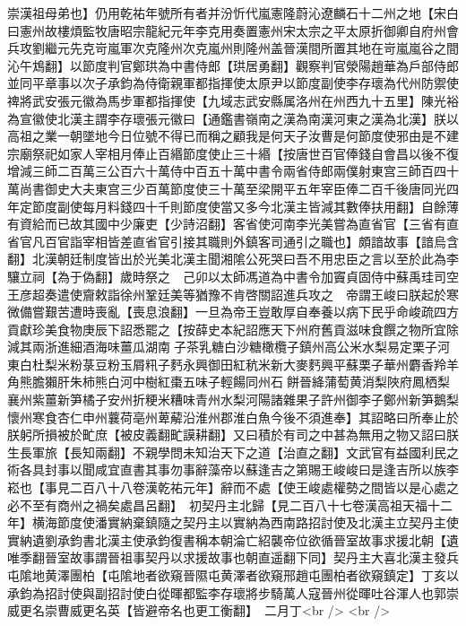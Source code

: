 崇漢祖母弟也】仍用乾祐年號所有者并汾忻代嵐憲隆蔚沁遼麟石十二州之地【宋白曰憲州故樓煩監牧唐昭宗龍紀元年李克用奏置憲州宋太宗之平太原折御卿自府州會兵攻劉繼元先克岢嵐軍次克隆州次克嵐州則隆州盖晉漢間所置其地在岢嵐嵐谷之間沁午鴆翻】以節度判官鄭珙為中書侍郎【珙居勇翻】觀察判官滎陽趙華為戶部侍郎並同平章事以次子承鈞為侍衛親軍都指揮使太原尹以節度副使李存瓌為代州防禦使禆將武安張元徽為馬步軍都指揮使【九域志武安縣属洛州在州西九十五里】陳光裕為宣徽使北漢主謂李存瓌張元徽曰【通鑑書嶺南之漢為南漢河東之漢為北漢】朕以高祖之業一朝墜地今日位號不得已而稱之顧我是何天子汝曹是何節度使邪由是不建宗廟祭祀如家人宰相月俸止百緡節度使止三十緡【按唐世百官俸錢自會昌以後不復增減三師二百萬三公百六十萬侍中百五十萬中書令兩省侍郎兩僕射東宫三師百四十萬尚書御史大夫東宫三少百萬節度使三十萬至梁開平五年宰臣俸二百千後唐同光四年定節度副使每月料錢四十千則節度使當又多今北漢主皆減其數俸扶用翻】自餘薄有資給而已故其國中少廉吏【少詩沼翻】客省使河南李光美嘗為直省官【三省有直省官凡百官詣宰相皆差直省官引接其職則外鎮客司通引之職也】頗諳故事【諳烏含翻】北漢朝廷制度皆出於光美北漢主聞湘隂公死哭曰吾不用忠臣之言以至於此為李驤立祠【為于偽翻】歲時祭之　己卯以太師馮道為中書令加竇貞固侍中蘇禹珪司空　王彦超奏遣使齎敕詣徐州鞏廷美等猶豫不肯啓關詔進兵攻之　帝謂王峻曰朕起於寒微備嘗艱苦遭時喪亂【喪息浪翻】一旦為帝王豈敢厚自奉養以病下民乎命峻疏四方貢獻珍美食物庚辰下詔悉罷之【按薛史本紀詔應天下州府舊貢滋味食饌之物所宜除減其兩浙進細酒海味薑瓜湖南子茶乳糖白沙糖橄欖子鎮州高公米水梨易定栗子河東白杜梨米粉菉豆粉玉屑籸子麫永興御田紅秔米新大麥麫興平蘇栗子華州麝香羚羊角熊膽獺肝朱柿熊白河中樹紅棗五味子輕餳同州石餅晉絳蒲萄黄消梨陜府鳳栖梨襄州紫薑新笋橘子安州折粳米糟味青州水梨河陽諸雜果子許州御李子鄭州新笋鵝梨懷州寒食杏仁申州蘘荷亳州萆薢沿淮州郡淮白魚今後不須進奉】其詔略曰所奉止於朕躬所損被於甿庶【被皮義翻甿謨耕翻】又曰積於有司之中甚為無用之物又詔曰朕生長軍旅【長知兩翻】不親學問未知治天下之道【治直之翻】文武官有益國利民之術各具封事以聞咸宜直書其事勿事辭藻帝以蘇逢吉之第賜王峻峻曰是逢吉所以族李崧也【事見二百八十八卷漢乾祐元年】辭而不處【使王峻處權勢之間皆以是心處之必不至有商州之禍矣處昌呂翻】　初契丹主北歸【見二百八十七卷漢高祖天福十二年】横海節度使潘實納棄鎮隨之契丹主以實納為西南路招討使及北漢主立契丹主使實納遺劉承鈞書北漢主使承鈞復書稱本朝淪亡紹襲帝位欲循晉室故事求援北朝【遺唯季翻晉室故事謂晉祖事契丹以求援故事也朝直遥翻下同】契丹主大喜北漢主發兵屯隂地黄澤團柏【屯隂地者欲窺晉隰屯黄澤者欲窺邢趙屯團柏者欲窺鎮定】丁亥以承鈞為招討使與副招討使白從暉都監李存瓌將步騎萬人寇晉州從暉吐谷渾人也郭崇威更名崇曹威更名英【皆避帝名也更工衡翻】　二月丁<br />
<br />
